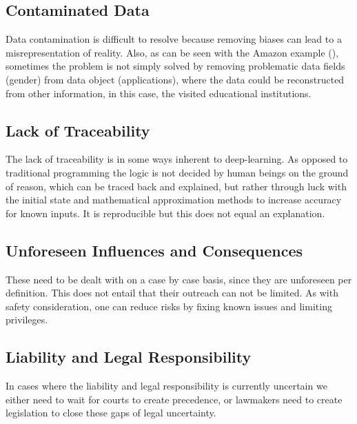 \subsection{Contaminated Data}
Data contamination is difficult to resolve because removing biases can lead to a misrepresentation of reality. Also, as can be seen with the Amazon example (\cite{Higginbottom2018}), sometimes the problem is not simply solved by removing problematic data fields (gender) from data object (applications), where the data could be reconstructed from other information, in this case, the visited educational institutions.


\subsection{Lack of Traceability} %
The lack of traceability is in some ways inherent to deep-learning. As opposed to traditional programming the logic is not decided by human beings on the ground of reason, which can be traced back and explained, but rather through luck with the initial state and mathematical approximation methods to increase accuracy for known inputs. It is reproducible but this does not equal an explanation.

\subsection{Unforeseen Influences and Consequences}
These need to be dealt with on a case by case basis, since they are unforeseen per definition. This does not entail that their outreach can not be limited. As with safety consideration, one can reduce risks by fixing known issues and limiting privileges.

\subsection{Liability and Legal Responsibility}
In cases where the liability and legal responsibility is currently uncertain
we either need to wait for courts to create precedence, or lawmakers need to create legislation to close these gaps of legal uncertainty.

